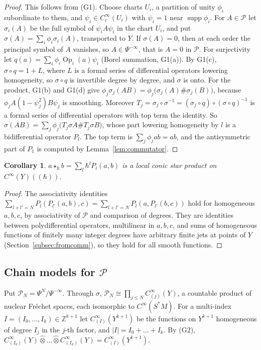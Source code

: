\documentclass[11pt,oneside,reqno]{article}
\DeclareMathOperator{\supp}{supp}
\DeclareMathOperator{\Op}{Op}
\newcommand{\Z}{\mathbb Z}
\newcommand{\cP}{\mathcal P}
\newcommand{\CI}{C^\infty}
\newcommand{\hot}{\mathbin{\widehat\otimes}}
\newcommand{\hb}{\hbar}
\newcommand{\Lser}[1]{(\!(#1)\!)}
\theoremstyle{plain}
\newtheorem{corollary}[theorem]{Corollary}
\theoremstyle{definition}
\theoremstyle{remark}
\begin{document}
\begin{proof}
This follows from (G1). Choose charts \(U_i\), a partition of unity \(\phi_i\)
subordinate to them, and \(\psi_i\in\CI_c(U_i)\) with \(\psi_i=1\) near \(\supp\phi_i\).
For \(A\in\cP\) let \(\sigma_i(A)\) be the full symbol of \(\psi_iA\psi_i\) in the chart
\(U_i\), and put \(\sigma(A)=\sum_i\phi_i\sigma_i(A)\), transported to \(Y\). If
\(\sigma(A)=0\), then at each order the principal symbol of \(A\) vanishes, so
\(A\in\Psi^{-\infty}\), that is \(A=0\) in \(\cP\). For surjectivity let
\(q(a)=\sum_i\phi_i\Op_i(a)\psi_i\) (Borel summation, G1(a)). By G1(c),
\(\sigma\circ q=1+L\), where \(L\) is a formal series of differential operators
lowering homogeneity, so \(\sigma\circ q\) is invertible degree by degree, and
\(\sigma\) is onto. For the product, G1(b) and G1(d) give
\(\phi_j\sigma_j(AB)=\phi_j\bigl(\sigma_j(A)\#\sigma_j(B)\bigr)\), because
\(\phi_jA(1-\psi_j^2)B\psi_j\) is smoothing. Moreover \(T_j=\sigma_j\circ\sigma^{-1}=
(\sigma_j\circ q)\circ(\sigma\circ q)^{-1}\) is a formal series of differential
operators with top term the identity. So
\(\sigma(AB)=\sum_j\phi_j\bigl(T_j\sigma A\#T_j\sigma B\bigr)\), whose part lowering
homogeneity by \(l\) is a bidifferential operator \(P_l\). The top term is
\(\sum_j\phi_jab=ab\), and the antisymmetric part of \(P_1\) is computed by
Lemma~\ref{lem:commutator}.
\end{proof}

\begin{corollary}\label{cor:conicTM}
\(a\star_\hb b=\sum_l\hb^lP_l(a,b)\) is a local conic star product on \(\CI(Y)\Lser{\hb}\).
\end{corollary}

\begin{proof}
The associativity identities
\(\sum_{l+l'=N}P_l(P_{l'}(a,b),c)=\sum_{l+l'=N}P_l(a,P_{l'}(b,c))\) hold for
homogeneous \(a,b,c\), by associativity of \(\cP\) and comparison of degrees. They
are identities between polydifferential operators, multilinear in \(a,b,c\), and
sums of homogeneous functions of finitely many integer degrees have arbitrary
finite jets at points of \(Y\) (Section~\ref{subsec:fromcomm}), so they hold for all
smooth functions.
\end{proof}

\subsection{Chain models for \texorpdfstring{\(\cP\)}{P}}\label{subsec:chainmodels}
Put \(\cP_N=\Psi^N/\Psi^{-\infty}\). Through \(\sigma\), \(\cP_N\cong\prod_{j\le N}\CI_{(j)}(Y)\),
a countable product of nuclear Fréchet spaces, each isomorphic to \(\CI(S^*M)\).
For a multi-index \(I=(I_0,\dots,I_k)\in\Z^{k+1}\) let \(\CI_{(I)}(Y^{k+1})\) be the
functions on \(Y^{k+1}\) homogeneous of degree \(I_j\) in the \(j\)-th factor, and
\(|I|=I_0+\dots+I_k\). By (G2), \(\CI_{(I_0)}(Y)\hot\dots\hot\CI_{(I_k)}(Y)=\CI_{(I)}(Y^{k+1})\).
\end{document}
